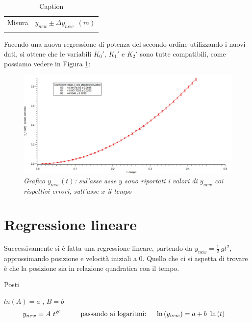 \documentclass[12pt, a4paper]{article}
\begin{document}
\begin{table}[!h]
    \centering
    \begin{tabular}{|c|c|}
    \hline
    \multirow{2}{*}{\small Misura} 
    &\multirow{2}{*}{\small$y_{new} \pm\Delta y_{new}$\ $(m)$} 
     
    \\
    & 
    \\
    \hline
    \hline
       &   \\
    \hline
    \end{tabular}
        \caption{Caption}
        \label{tab:ynew con errore }
\end{table}

Facendo una nuova regressione di potenza del secondo ordine utilizzando i nuovi dati, si ottene che le variabili $K_0'$, $K_1'$ e $K_2'$ sono tutte compatibili, come possiamo vedere in Figura \ref{Grafico parabolico}:
\bigskip
\bigskip

    \begin{figure}[h!]
\centering
\includegraphics[width=170mm]{Immagini/Graph1.jpg}
\caption{\textit{{\footnotesize{Grafico $y_{new}(t)$: sul'asse asse $y$ sono riportati i valori di $y_{new}$ coi rispettivi errori, sull'asse $x$ il tempo}}}}
\label{Grafico parabolico}
\end{figure}



\section{Regressione lineare}
Successivamente si è fatta una regressione lineare, partendo da $y_{new}= \frac{1}{2}\ g t^2$, approssimando posizione e velocità iniziali a $0$. Quello che ci si aspetta di trovare è che la posizione sia in relazione quadratica con il tempo.

Posti

\phantom{aad} $ln{(A)}=a$ \phantom{aad} , \phantom{aad} $B=b$
\begin{equation*}
\begin{aligned}
  & y_{new}= A\ t^B
  &\quad{} 
  \end{aligned}
  \begin{aligned}
  &&\text{passando ai logaritmi:\phantom{..}}& & \ln{(y_{new})}=a +b\ \ln{(t)}
  &
  \end{aligned}
\end{equation*}
\end{document}
